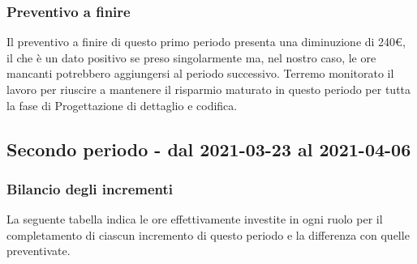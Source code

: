 {{{{{{{{	
\subsubsection{Preventivo a finire}\label{ConsuntivoPrimoPeriodoDiProgettazioneDiDettaglioCodificaPreventivoFinire}
	Il preventivo a finire di questo primo periodo presenta una diminuzione di 240\euro, il che è un dato positivo se preso singolarmente ma, nel nostro caso, le ore mancanti potrebbero aggiungersi al periodo successivo. Terremo monitorato il lavoro per riuscire a mantenere il risparmio maturato in questo periodo per tutta la fase di Progettazione di dettaglio e codifica.
	
\subsection{Secondo periodo - dal 2021-03-23 al 2021-04-06 }\label{ConsuntivoSecondoPeriodoDiProgettazioneDiDettaglioCodifica}
	
\subsubsection{Bilancio degli incrementi}\label{ConsuntivoSecondoPeriodoDiProgettazioneDiDettaglioCodificaIncrementi}
	
	La seguente tabella indica le ore effettivamente investite in ogni ruolo per il completamento di ciascun incremento di questo periodo e la differenza con quelle preventivate.

\quad
\def\tabularxcolumn#1{m{#1}}
{
	
}}}}}}}}}
